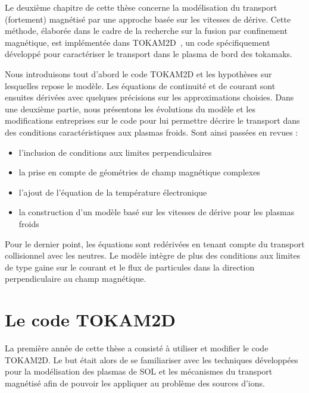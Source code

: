 \begin{refsection}
Le deuxième chapitre de cette thèse concerne la modélisation du transport
(fortement) magnétisé par une approche basée sur les vitesses de dérive. Cette
méthode, élaborée dans le cadre de la recherche sur la fusion par
confinement magnétique, est implémentée dans TOKAM2D~\cite{Sarazin}, un code 
spécifiquement développé pour caractériser le transport dans le plasma de bord
des tokamaks.

Nous introduisons tout d'abord le code TOKAM2D et les hypothèses sur
lesquelles repose le modèle. Les équations de continuité et de
courant sont ensuites dérivées avec quelques précisions sur les approximations
choisies.
Dans une deuxième partie, nous présentons les évolutions du
modèle et les modifications entreprises sur le code pour lui
permettre décrire le transport dans des conditions caractéristiques aux plasmas
froids. Sont ainsi passées en revues :

\begin{itemize}
  \item l'inclusion de conditions aux limites
perpendiculaires
\item la prise en compte de géométries de champ magnétique complexes
\item l'ajout de l'équation de la
température électronique
\item la construction d'un modèle basé sur les vitesses de dérive pour les plasmas froids
\end{itemize}

Pour le dernier point, les équations sont redérivées en tenant
compte du transport collisionnel avec les neutres. Le modèle intègre de plus des
conditions aux limites de type gaine sur le courant et le flux de particules
dans la direction perpendiculaire au champ magnétique.

\section{Le code TOKAM2D}

La première année de cette thèse a consisté à utiliser et modifier le
code {TOKAM2D}. Le but était alors de se familiariser avec les
techniques développées pour la modélisation des plasmas
de SOL et les mécanismes du transport magnétisé afin
de pouvoir les appliquer au problème des sources d'ions. 


\end{refsection}
